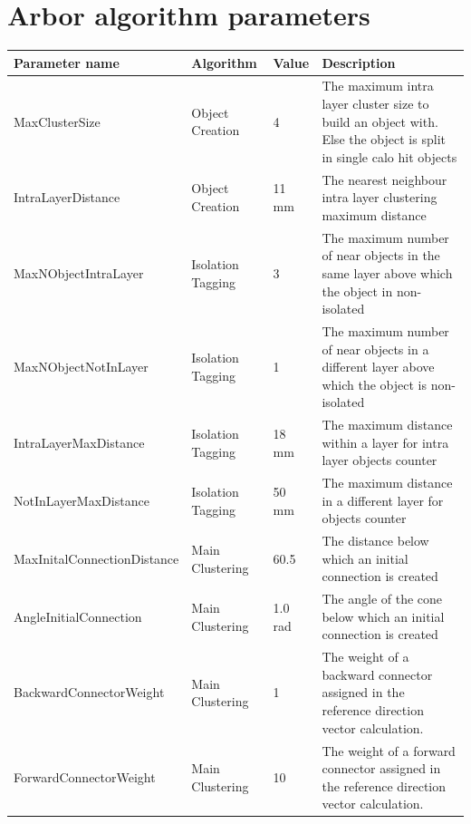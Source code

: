 \documentclass[cits]{JINST}
\begin{document}
\clearpage
\appendix

\section{Arbor algorithm parameters}
\label{ARBOR_ALGORITHM_PARAMETERS}

\begin{center}  
  \begin{table}[!ht]
    \begin{tabu} to \linewidth {| l | X | l | X |} 
          \hline
          Parameter name & Algorithm & Value & Description \\ 
          \hline \hline
          MaxClusterSize & Object Creation & 4 & The maximum intra layer cluster size to build an object with. Else the object is split in single calo hit objects \\ 
          \hline
          IntraLayerDistance & Object Creation & 11 mm & The nearest neighbour intra layer clustering maximum distance \\
          \hline
           MaxNObjectIntraLayer & Isolation Tagging & 3 & The maximum number of near objects in the same layer above which the object in non-isolated \\
          \hline
          MaxNObjectNotInLayer & Isolation Tagging & 1 & The maximum number of near objects in a different layer above which the object is non-isolated \\ \hline
          IntraLayerMaxDistance & Isolation Tagging & 18 mm & The maximum distance within a layer for intra layer objects counter \\ 
          \hline
          NotInLayerMaxDistance & Isolation Tagging & 50 mm & The maximum distance in a different layer for objects counter \\
          \hline
          MaxInitalConnectionDistance & Main Clustering & 60.5 & The distance below which an initial connection is created \\
          \hline
          AngleInitialConnection & Main Clustering & 1.0 rad & The angle of the cone below which an initial connection is created \\
          \hline
          BackwardConnectorWeight & Main Clustering & 1 & The weight of a backward connector assigned in the reference direction vector calculation. \\
          \hline
          ForwardConnectorWeight & Main Clustering & 10 & The weight of a forward connector assigned in the reference direction vector calculation. \\

\end{tabu}
\end{table}
\end{center}
\end{document}
